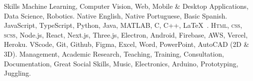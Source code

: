
\begin{rubric}{Skills}
  Machine Learning, Computer Vision, Web, Mobile \& Desktop Applications, Data Science, Robotics.
  \vspace{0.05cm}
  Native English, Native Portuguese, Basic Spanish.
  \vspace{0.05cm}
  JavaScript, TypeScript, Python, Java, MATLAB, C, C++, \LaTeX\ .
  \vspace{0.05cm}
  \textsc{Html, css, scss}, Node.js, React, Next.js, Three.js, Electron, Android, Firebase, AWS, Vercel, Heroku.
  \vspace{0.05cm}
  VScode, Git, Github, Figma, Excel, Word, PowerPoint, AutoCAD (2D \& 3D).
  \vspace{0.05cm}
  Management, Academic Research, Teaching, Training, Consultation, Documentation, Great Social Skills, Music, Electronics, Arduino, Prototyping, Juggling.
\end{rubric}
